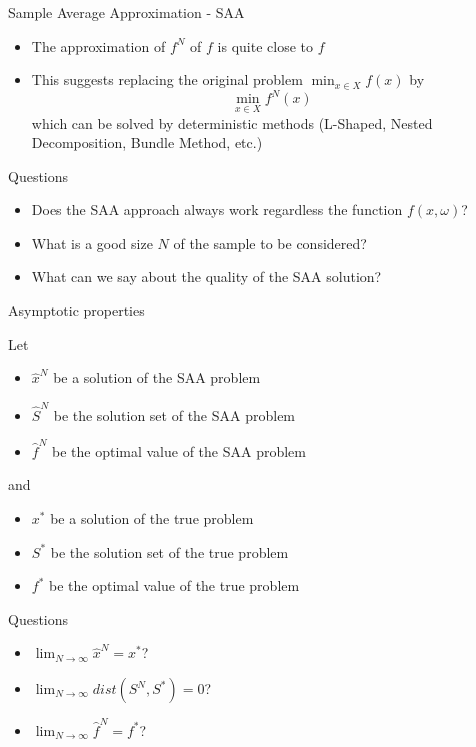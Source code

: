 \begin{frame}{Sample Average Approximation - SAA}

\begin{itemize}

\item The approximation of $f^N$ of $f$ is quite close to $ f $
\pula

\item This suggests replacing the original problem $ \min_{x \in X} f (x) $ by
\[
\min_{x \in X} f^N (x)
\]
which can be solved by deterministic methods (L-Shaped, Nested Decomposition, Bundle Method, etc.)
\end{itemize}
\begin{block}{Questions}
\begin{itemize}
\item Does the SAA approach always work regardless the function $f(x,\omega)$?
\pula

\item What is a good size $N$ of the sample to be considered?
\pula

\item What can we say about the quality of the SAA solution?
\end{itemize}
\end{block}

 \end{frame}




\begin{frame}{Asymptotic properties}

Let
\begin{itemize}
\item $\hat x^N$ be a solution of the SAA problem
\item $\hat S^N$ be the solution set of the SAA problem
\item $\hat f^N$ be the optimal value of the SAA problem
\end{itemize}
and
\begin{itemize}
\item $ x^*$ be a solution of the true problem
\item $S^*$ be the solution set of the true problem
\item $f^*$ be the optimal value of the true problem
\end{itemize}


\begin{block}{Questions}
\begin{itemize}
\item $\lim_{N\to \infty} \hat x^N = x^*$?
\pula
\item $\lim_{N\to \infty} dist(S^N,S^*) = 0$?
\pula
\item $\lim_{N\to \infty} \hat f^N = f^*$?

\end{itemize}
\end{block}
 \end{frame}



